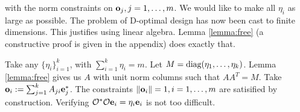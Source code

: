 \documentclass{amsart}
\numberwithin{equation}{section}
\begin{document}
with the norm constraints on $\mathbf{o}_j,j=1,\dots,m$. We would like to
make all $\eta_i$ as large as possible.  The problem of D-optimal
design has now been cast to finite dimensions. This justifies using
linear algebra. Lemma \ref{lemma:free} (a constructive proof is given
in the appendix) does exactly that.

Take any $\{\eta_i\}_{i=1}^{k}$, with $\sum_{i=1}^k \eta_i = m$. Let
$M = \textup{diag}(\eta_1,\dots,\eta_k)$. Lemma \ref{lemma:free} gives us $A$
with unit norm columns such that $AA^T = M$. Take $\mathbf{o}_i
:=\sum_{j=1}^k A_{ji}\mathbf{e}_j^*$. The constraints $\|\mathbf{o}_i\| = 1,
i=1,\dots,m$ are satisified by construction. Verifying $\mathcal{O}^*\mathcal{O}
\mathbf{e}_i = \eta_i \mathbf{e}_i$ is not too difficult.



\end{document}
